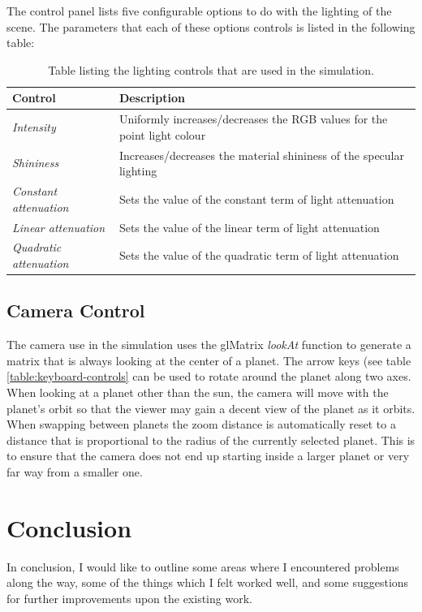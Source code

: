 \documentclass[paper=a4, fontsize=11pt]{scrartcl}	%
\numberwithin{equation}{section}															%
\numberwithin{figure}{section}																%
\numberwithin{table}{section}																%
\begin{document}
The control panel lists five configurable options to do with the lighting of the scene. The parameters that each of these options controls is listed in the following table:

\begin{table}[H]
\centering
\begin{tabular}{ l p{12cm}}
Control & Description \\ \hline
\textit{Intensity} & Uniformly increases/decreases the RGB values for the point light colour \\ \hline
\textit{Shininess} & Increases/decreases the material shininess of the specular lighting\\ \hline
\textit{Constant attenuation} & Sets the value of the constant term of light attenuation \\ \hline
\textit{Linear attenuation} & Sets the value of the linear term of light attenuation \\ \hline
\textit{Quadratic attenuation} & Sets the value of the quadratic term of light attenuation \\ \hline

\end{tabular}
\caption{Table listing the lighting controls that are used in the simulation.}
\label{table:lighting-controls}
\end{table}

\subsection{Camera Control}
The camera use in the simulation uses the glMatrix \textit{lookAt} function to generate a matrix that is always looking at the center of a planet. The arrow keys (see table \ref{table:keyboard-controls} can be used to rotate around the planet along two axes. When looking at a planet other than the sun, the camera will move with the planet's orbit so that the viewer may gain a decent view of the planet as it orbits. When swapping between planets the zoom distance is automatically reset to a distance that is proportional to the radius of the currently selected planet. This is to ensure that the camera does not end up starting inside a larger planet or very far way from a smaller one.

\section{Conclusion}
\label{sec:conclusion}
In conclusion, I would like to outline some areas where I encountered problems along the way, some of the things which I felt worked well, and some suggestions for further improvements upon the existing work. 
\end{document}
